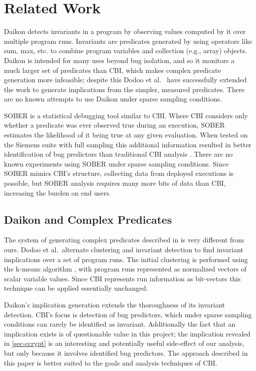 
\section{Related Work}
\label{sec-rw}
Daikon \cite{ErnstPGMPTX2006} detects invariants in a program by observing values computed by it over multiple program runs.  Invariants are predicates generated by using operators like sum, max, etc. to combine program variables and collection (e.g., array) objects.  Daikon is intended for many uses beyond bug isolation, and so it monitors a much larger set of predicates than CBI, which makes complex predicate generation more infeasible; despite this Dodoo et al.\ \cite{ErnstDRAFT} have successfully extended the work to generate implications from the simpler, measured predicates.  There are no known attempts to use Daikon under sparse sampling conditions.

SOBER \cite{1081753} is a statistical debugging tool similar to CBI.  Where CBI considers only whether a predicate was ever observed true during an execution, SOBER estimates the likelihood of it being true at any given evaluation.  When tested on the Siemens suite with full sampling this additional information resulted in better identification of bug predictors than traditional CBI analysis \cite{1081753}.  There are no known experiments using SOBER under sparse sampling conditions.  Since SOBER mimics CBI's structure, collecting data from deployed executions is possible, but SOBER analysis requires many more bits of data than CBI, increasing the burden on end users.

\subsection{Daikon and Complex Predicates}
\label{sec-daikon}
The system of generating complex predicates described in \cite{ErnstDRAFT} is very different from ours.  Dodoo et al.\ alternate clustering and invariant detection to find invariant implications over a set of program runs.  The initial clustering is performed using the k-means algorithm \cite{jain99data}, with program runs represented as normalized vectors of scalar variable values.  Since CBI represents run information as bit-vectors this technique can be applied essentially unchanged.

Daikon's implication generation extends the thoroughness of its invariant detection.  CBI's focus is detection of bug predictors, which under sparse sampling conditions can rarely be identified as invariant.  Additionally the fact that an implication exists is of questionable value in this project; the implication revealed in \autoref{sec-ccrypt} is an interesting and potentially useful side-effect of our analysis, but only because it involves identified bug predictors.  The approach described in this paper is better suited to the goals and analysis techniques of CBI.


